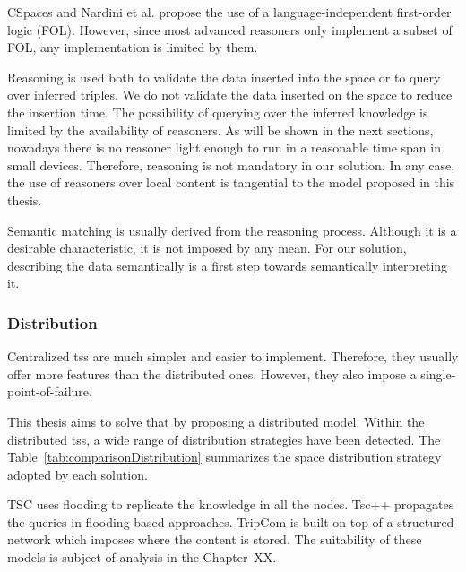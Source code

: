 CSpaces and Nardini et al. propose the use of a language-independent first-order logic (FOL).
However, since most advanced reasoners only implement a subset of FOL, any implementation is limited by them. %

Reasoning is used both to validate the data inserted into the space or to query over inferred triples.
We do not validate the data inserted on the space to reduce the insertion time.
The possibility of querying over the inferred knowledge is limited by the availability of reasoners.
As will be shown in the next sections, nowadays there is no reasoner light enough to run in a reasonable time span in small devices.
Therefore, reasoning is not mandatory in our solution.
In any case, the use of reasoners over local content is tangential to the model proposed in this thesis.

Semantic matching is usually derived from the reasoning process.
Although it is a desirable characteristic, it is not imposed by any mean.
For our solution, describing the data semantically is a first step towards semantically interpreting it.






\subsubsection{Distribution}

Centralized \aclp{ts} are much simpler and easier to implement.
Therefore, they usually offer more features than the distributed ones.
However, they also impose a single-point-of-failure.

This thesis aims to solve that by proposing a distributed model.
Within the distributed \aclp{ts}, a wide range of distribution strategies have been detected.
The Table~\ref{tab:comparisonDistribution} summarizes the space distribution strategy adopted by each solution.

TSC uses flooding to replicate the knowledge in all the nodes.
Tsc++ propagates the queries in flooding-based approaches.
TripCom is built on top of a structured-network which imposes where the content is stored.
The suitability of these models is subject of analysis in the Chapter~XX.

